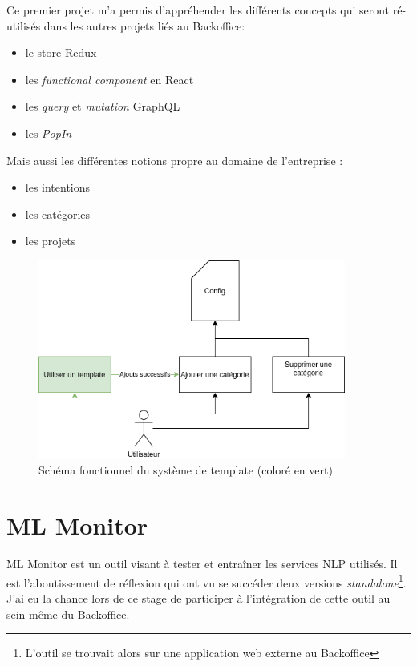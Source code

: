 \documentclass[12pt,a4paper,oneside]{scrreprt}
\begin{document}
\begin{info}
	Ce premier projet m'a permis d'appréhender les différents concepts qui seront ré-utilisés dans les autres projets liés au Backoffice:
	\begin{itemize}
		\item le store Redux
		\item les \textit{functional component} en React
		\item les \textit{query} et \textit{mutation} GraphQL
		\item les \textit{PopIn}
	\end{itemize}

	Mais aussi les différentes notions propre au domaine de l'entreprise :
	\begin{itemize}
		\item les intentions
		\item les catégories
		\item les projets
	\end{itemize}
\end{info}

\begin{figure}[!ht]
	\centering
	\includegraphics[width=0.9\textwidth]{pictures/diag_template}
	\caption{Schéma fonctionnel du système de template (coloré en vert)}
\end{figure}

\newpage
\section{ML Monitor}

ML Monitor est un outil visant à tester et entraîner les services NLP utilisés. Il est l'aboutissement de réflexion qui ont vu se succéder deux versions \textit{standalone}\footnote{L'outil se trouvait alors sur une application web externe au Backoffice}. J'ai eu la chance lors de ce stage de participer à l'intégration de cette outil au sein même du Backoffice.
\end{document}
